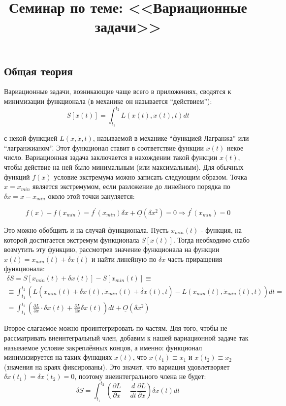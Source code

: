 \documentclass[a4paper,12pt]{article}
\begin{document}
\title{Семинар по теме: <<Вариационные задачи>>}
\maketitle
\subsection*{Общая теория}

Вариационные задачи, возникающие чаще всего в приложениях, сводятся
к минимизации функционала (в механике он называется ``действием''):
\[
S\left[x\left(t\right)\right]=\int_{t_{1}}^{t_{2}}L(x(t),\dot{x}(t),t)dt
\]

\noindent
с некой функцией $L(x,\dot{x},t)$, называемой в механике ``функцией
Лагранжа'' или ``лагранжианом''. Этот функционал ставит в соответствие
функции $x(t)$ некое число. Вариационная задача заключается в нахождении
такой функции $x(t)$, чтобы действие на ней было минимальным (или
максимальным).
\noindent
Для обычных функций $f(x)$ условие экстремума можно записать следующим
образом. Точка $x=x_{min}$ является экстремумом, если разложение
до линейного порядка по $\delta x=x-x_{min}$ около этой точки зануляется:

\[
f(x)-f(x_{min})=f^{\prime}(x_{min})\delta x+\underline{O}(\delta x^{2})=0\Rightarrow f^{\prime}(x_{min})=0
\]

\noindent
Это можно обобщить и на случай функционала. Пусть $x_{min}(t)$ -
функция, на которой достигается экстремум функционала $S[x(t)]$.
Тогда необходимо слабо возмутить эту функцию, рассмотрев значение
функционала на функции $x(t)=x_{min}(t)+\delta x(t)$ и найти линейную
по $\delta x$ часть приращения функционала:
\begin{multline*}
\delta S=S[x_{min}(t)+\delta x(t)]-S[x_{min}(t)]\equiv\\
\equiv \int_{t_{1}}^{t_{2}}\left(L(x_{min}(t)+\delta x(t),\dot{x}_{min}(t)+\dot{\delta x}(t),t)-L(x_{min}(t),\dot{x}_{min}(t),t)\right)dt=\\
=\int_{t_{1}}^{t_{2}}\left(\frac{\partial L}{\partial x}\cdot\delta x(t)+\frac{\partial L}{\partial\dot{x}}\dot{\delta x}(t)\right)dt+\underline{O}(\delta x^{2})
\end{multline*}

\noindent
Второе слагаемое можно проинтегрировать по частям. Для того, чтобы
не рассматривать внеинтегральный член, добавим к нашей вариационной
задаче так называемое условие закреплённых концов, а именно: функционал
минимизируется на таких функциях $x(t)$, что $x(t_{1})\equiv x_{1}$
и $x(t_{2})\equiv x_{2}$ (значения на краях фиксированы). Это значит,
что вариация удовлетворяет $\delta x(t_{1})=\delta x(t_{2})=0$, поэтому
внеинтегрального члена не будет:
\[
\delta S=\int_{t_{1}}^{t_{2}}\left(\frac{\partial L}{\partial x}-\frac{d}{dt}\frac{\partial L}{\partial\dot{x}}\right)\delta x(t)dt
\]
\end{document}
